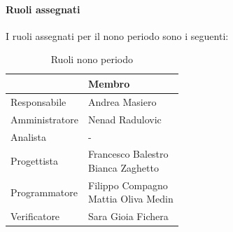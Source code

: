 \documentclass[a4paper,12pt]{article}
\begin{document}
            \paragraph{Ruoli assegnati}
            I ruoli assegnati per il nono periodo sono i seguenti:
                \begin{table}[H]
                \centering
                \caption{Ruoli nono periodo}
                \begin{tabular}{|l|l|}
                \hline
                    \rowcolor{lightgray}{\textbf{Ruolo}} & {\textbf{Membro}} \\
                \hline
                    Responsabile & Andrea Masiero  \\
                \hline
                    Amministratore & Nenad Radulovic  \\
                \hline
                    Analista & - \\
                \hline
                    Progettista & \makecell[l]{ Francesco Balestro \\ Bianca Zaghetto}  \\
                \hline
                    Programmatore & \makecell[l]{ Filippo Compagno \\ Mattia Oliva Medin} \\
                \hline
                    Verificatore & Sara Gioia Fichera \\
                \hline
                \end{tabular}
                \end{table}
                
\end{document}

